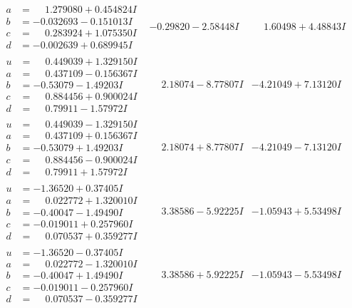 \documentclass[1p]{elsarticle_modified}
\theoremstyle{definition}
\begin{document}
$$\begin{array}{c|c|c}
\begin{aligned}
a &= \phantom{-}1.279080 + 0.454824 I \\
b &= -0.032693 - 0.151013 I \\
c &= \phantom{-}0.283924 + 1.075350 I \\
d &= -0.002639 + 0.689945 I\end{aligned}
 & -0.29820 - 2.58448 I & \phantom{-}1.60498 + 4.48843 I \\ \hline\begin{aligned}
u &= \phantom{-}0.449039 + 1.329150 I \\
a &= \phantom{-}0.437109 - 0.156367 I \\
b &= -0.53079 - 1.49203 I \\
c &= \phantom{-}0.884456 + 0.900024 I \\
d &= \phantom{-}0.79911 - 1.57972 I\end{aligned}
 & \phantom{-}2.18074 - 8.77807 I & -4.21049 + 7.13120 I \\ \hline\begin{aligned}
u &= \phantom{-}0.449039 - 1.329150 I \\
a &= \phantom{-}0.437109 + 0.156367 I \\
b &= -0.53079 + 1.49203 I \\
c &= \phantom{-}0.884456 - 0.900024 I \\
d &= \phantom{-}0.79911 + 1.57972 I\end{aligned}
 & \phantom{-}2.18074 + 8.77807 I & -4.21049 - 7.13120 I \\ \hline\begin{aligned}
u &= -1.36520 + 0.37405 I \\
a &= \phantom{-}0.022772 + 1.320010 I \\
b &= -0.40047 - 1.49490 I \\
c &= -0.019011 + 0.257960 I \\
d &= \phantom{-}0.070537 + 0.359277 I\end{aligned}
 & \phantom{-}3.38586 - 5.92225 I & -1.05943 + 5.53498 I \\ \hline\begin{aligned}
u &= -1.36520 - 0.37405 I \\
a &= \phantom{-}0.022772 - 1.320010 I \\
b &= -0.40047 + 1.49490 I \\
c &= -0.019011 - 0.257960 I \\
d &= \phantom{-}0.070537 - 0.359277 I\end{aligned}
 & \phantom{-}3.38586 + 5.92225 I & -1.05943 - 5.53498 I\\

\end{array}$$
\end{document}
